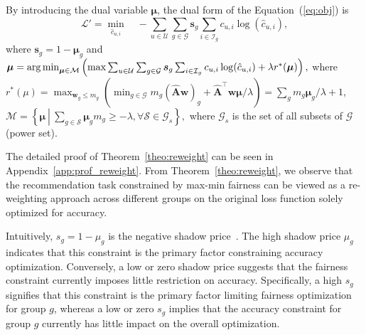 \begin{theorem}\label{theo:reweight}
    By introducing the dual variable $\bm{\mu}$, the dual form of the Equation~(\ref{eq:obj}) is
    \begin{equation}\label{eq:reweight}
        \mathcal{L}' = \min_{\hat{c}_{u,i}} \quad -\sum_{u\in\mathcal{U}}\sum_{g\in\mathcal{G}}\bm{s}_g\sum_{i\in\mathcal{I}_g}c_{u,i}\log(\hat{c}_{u,i}),
    \end{equation}
    where $\bm{s}_g = 1-\bm{\mu}_g$ and 
    $
    \bm{\mu} =  \operatorname*{arg\,min}_{\bm{\mu}\in\mathcal{M}} \left(\max \sum_{u\in\mathcal{U}}\sum_{g\in\mathcal{G}}\bm{s}_g\sum_{i\in\mathcal{I}_g}c_{u,i}\log(\hat{c}_{u,i}) + \lambda r^*(\bm{\mu})\right),
    $
    where $r^*(\mu) = \max_{\bm{w}_g\leq m_g} \left(\min_{g\in\mathcal{G}} m_g(\hat{\bm{A}}\bm{w})_g+\hat{\bm{A}}^{\top}\bm{w}\bm{\mu}/\lambda\right)=\sum_{g}m_g\bm{\mu}_g/\lambda+1$, $\mathcal{M}=\left\{\bm{\mu} ~\left|~ \sum_{g\in\mathcal{S}} \bm{\mu}_gm_g \ge -\lambda, \forall \mathcal{S}\in\mathcal{G}_s\right.\right\},$ where $\mathcal{G}_s$ is the set of all subsets of $\mathcal{G}$ (\ie power set).
\end{theorem}

The detailed proof of Theorem~\ref{theo:reweight} can be seen in Appendix~\ref{app:prof_reweight}. From Theorem~\ref{theo:reweight}, we observe that the recommendation task constrained by max-min fairness can be viewed as a re-weighting approach across different groups on the original loss function solely optimized for accuracy. 



Intuitively, $s_g=1-\mu_g$ is the negative shadow price~\citep{dreze1990policy}. The high shadow price $\mu_g$ indicates that this constraint is the primary factor constraining accuracy optimization. Conversely, a low or zero shadow price suggests that the fairness constraint currently imposes little restriction on accuracy. Specifically, a high $s_g$ signifies that this constraint is the primary factor limiting fairness optimization for group $g$, whereas a low or zero $s_g$ implies that the accuracy constraint for group $g$ currently has little impact on the overall optimization.

